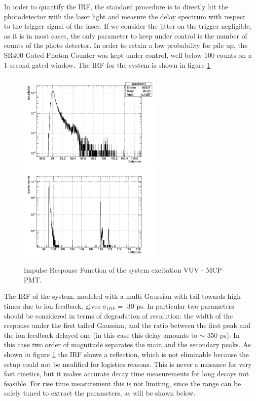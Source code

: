 In order to quantify the IRF, the standard procedure is to directly hit the photodetector with the laser light and measure the delay spectrum with respect to the trigger signal of the laser.
If we consider the jitter on the trigger negligible, as it is in most cases, the only parameter to keep under control is the number of counts of the photo detector. 
In order to retain a low probability for pile up, the SR400 Gated Photon Counter was kept under control, well below 100 counts on a 1-second gated window. 
The IRF for the system is shown in figure \ref{fig:IRF}
\begin{figure}[htbp]
\begin{center}
\includegraphics[width=7cm]{../Pictures/Chapter_7/IRF_simple.png}
\includegraphics[width=7cm]{../Pictures/Chapter_7/long.png}
\end{center}
\caption[VUV setup IRF]{Impulse Response Function of the system excitation VUV - MCP-PMT.}
\label{fig:IRF}
\end{figure}
The IRF of the system, modeled with a multi Gaussian with tail towards high times due to ion feedback, gives $\sigma _{IRF} = $ 30 ps.
In particular two parameters should be considered in terms of degradation of resolution: the width of the response under the first tailed Gaussian, and the ratio between the first peak and the ion feedback delayed one (in this case this delay amounts to $\sim$ 350 ps). In this case two order of magnitude separates the main and the secondary peaks.
As shown in figure \ref{fig:IRF} the IRF shows a reflection, which is not eliminable because the setup could not be modified for logistics reasons. This is never a nuisance for very fast cinetics, but it makes accurate decay time measurements for long decays not feasible. For rise time measurement this is not limiting, since the range can be safely tuned to extract the parameters, as will be shown below. 

